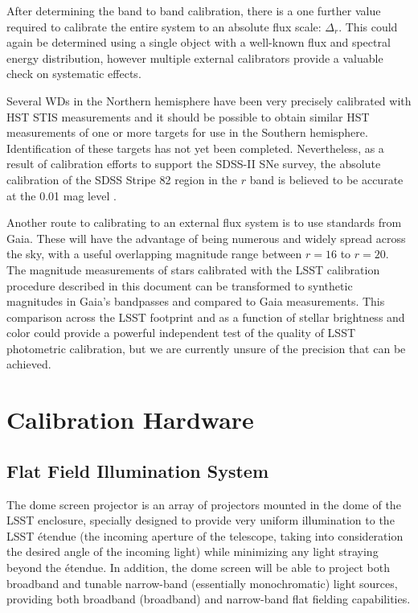 \documentclass[12pt,preprint]{aastex}
\begin{document}
After determining the band to band calibration, there is a one further
value required to calibrate the entire system to an absolute flux
scale: $\Delta_r$.  This could again be determined using a single
object with a well-known flux and spectral energy distribution,
however multiple external calibrators provide a valuable check on
systematic effects. 

Several WDs in the Northern hemisphere have been very precisely
calibrated with HST STIS measurements \citep{2004AJ....128.3053B} and
it should be possible to obtain similar HST measurements of one or
more targets for use in the Southern hemisphere. Identification of
these targets has not yet been completed. Nevertheless, as a result of
calibration efforts to support the SDSS-II SNe survey, the absolute
calibration of the SDSS Stripe 82 region in the $r$ band is believed
to be accurate at the 0.01 mag level \citep{Frieman2008}. 

Another route to calibrating to an external flux system is to use
standards from Gaia. These will have the advantage of being numerous
and widely spread across the sky, with a useful overlapping magnitude range between
$r=16$ to $r=20$.  The magnitude measurements of stars calibrated with
the LSST calibration procedure described in this document can be
transformed to synthetic magnitudes in Gaia's bandpasses and compared
to Gaia measurements. 
This comparison across the LSST footprint and as
a function of stellar brightness and color could provide a powerful
independent test of the quality of LSST photometric calibration, but we
are currently unsure of the precision that can be achieved. 

\section{Calibration Hardware}
\label{sec:calib_hardware}

\subsection{Flat Field Illumination System}
The dome screen projector is an array of projectors mounted in the
dome of the LSST enclosure, specially designed to provide very uniform
illumination to the LSST \'{e}tendue (the incoming aperture of the
telescope, taking into consideration the desired angle of the incoming
light) while minimizing any light straying beyond the \'{e}tendue. In
addition, the dome screen will be able to project both broadband and
tunable narrow-band (essentially monochromatic) light sources,
providing both broadband (broadband) and narrow-band flat fielding
capabilities.  
\end{document}
